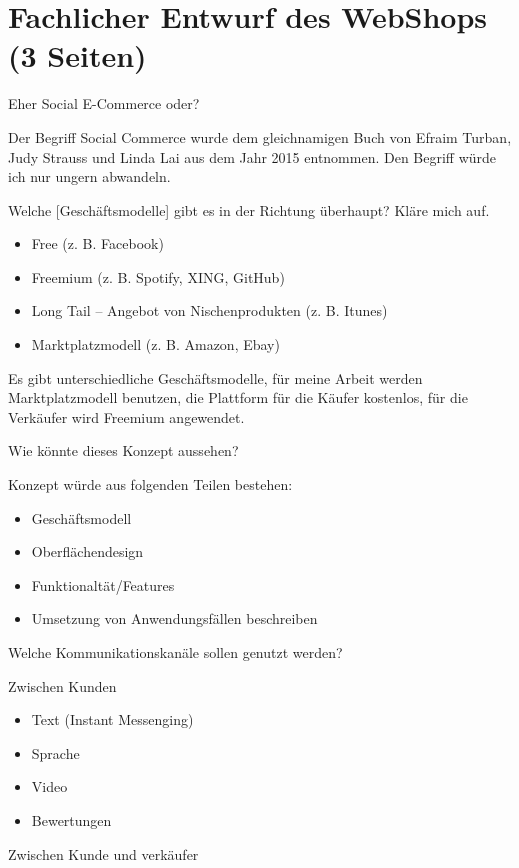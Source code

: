 
\chapter{Fachlicher Entwurf des WebShops (3 Seiten)}

Eher Social E-Commerce oder?

Der Begriff Social Commerce wurde dem gleichnamigen Buch von Efraim Turban, Judy Strauss und Linda Lai aus dem Jahr 2015 entnommen. Den Begriff würde ich nur ungern abwandeln. 

Welche [Geschäftsmodelle] gibt es in der Richtung überhaupt? Kläre mich auf. 

\begin{itemize}
\item Free (z. B. Facebook)
\item Freemium (z. B. Spotify, XING, GitHub)
\item Long Tail – Angebot von Nischenprodukten (z. B. Itunes)
\item Marktplatzmodell (z. B. Amazon, Ebay)
\end{itemize}

Es gibt unterschiedliche Geschäftsmodelle, für meine Arbeit werden Marktplatzmodell benutzen, die Plattform für die Käufer kostenlos, für die Verkäufer wird Freemium angewendet.

Wie könnte dieses Konzept aussehen? 

Konzept würde aus folgenden Teilen bestehen: 
\begin{itemize}
\item Geschäftsmodell 
\item Oberflächendesign 
\item Funktionaltät/Features 
\item Umsetzung von Anwendungsfällen beschreiben 
\end{itemize}

Welche Kommunikationskanäle sollen genutzt werden? 

Zwischen Kunden

\begin{itemize}
\item Text (Instant Messenging) 
\item Sprache 
\item Video 
\item Bewertungen 
\end{itemize}

Zwischen Kunde und verkäufer 

